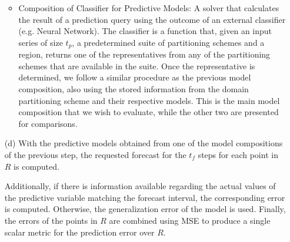 \begin{itemize}
\begin{itemize}
	\item Composition of Classifier for Predictive Models: A solver that calculates the result of a prediction query using the outcome of an external classifier (e.g. Neural Network). The classifier is a function that, given an input series of size $t_p$, a predetermined suite of partitioning schemes and a region, returns one of the representatives from any of the partitioning schemes that are available in the suite. Once the representative is determined, we follow a similar procedure as the previous model composition, also using the stored information from the domain partitioning scheme and their respective models. This is the main model composition that we wish to evaluate, while the other two are presented for comparisons.
    \end{itemize}
    \item [(d)] With the predictive models obtained from one of the model compositions of the previous step, the requested forecast for the $t_{f}$ steps for each point in $R$ is computed. 
    
    Additionally, if there is information available regarding the actual values of the predictive variable matching the forecast interval, the corresponding error is computed. Otherwise, the generalization error of the model is used. Finally, the errors of the points in $R$ are combined using MSE to produce a single scalar metric for the prediction error over $R$.
\end{itemize}



% 
%


